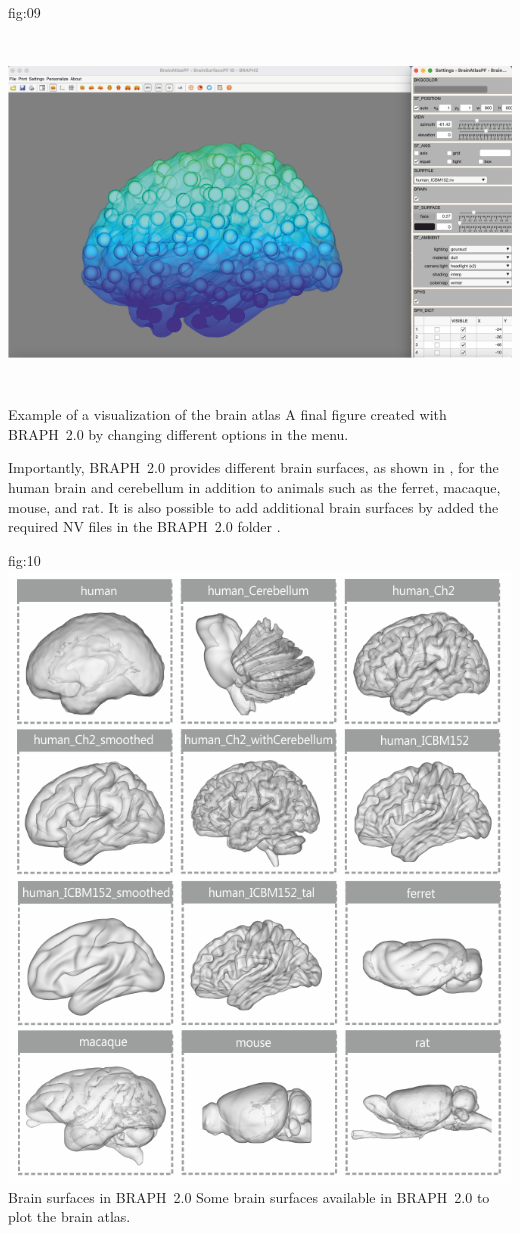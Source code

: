\documentclass[justified]{tufte-handout}
\begin{document}
	{fig:09}
	{\includegraphics[height=10cm]{tut_ba/fig09.png}}
	{Example of a visualization of the brain atlas}
	{
	A final figure created with BRAPH~2.0 by changing different options in the menu.
	}

Importantly, BRAPH~2.0 provides different brain surfaces, as shown in , for the human brain and cerebellum in addition to animals such as the ferret, macaque, mouse, and rat.
It is also possible to add additional brain surfaces by added the required NV files in the BRAPH~2.0 folder .

	{fig:10}
	{\includegraphics{tut_ba/fig10.png}}
	{Brain surfaces in BRAPH~2.0}
	{
	Some brain surfaces available in BRAPH~2.0 to plot the brain atlas.
	}
\end{document}
